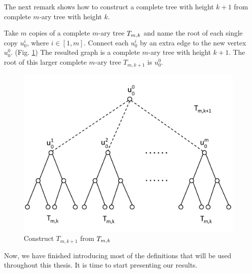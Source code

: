 The next remark shows how to construct a complete tree with height $k+1$ from complete $m$-ary tree with height $k$. 
 
\begin{remark}
\label{construct}
Take $m$ copies of a complete $m$-ary tree $T_{m,k}$ and name the root of each single copy $u_0^i$, where $i \in [1,m]$. Connect each $u_0^i$ by an extra edge to the new vertex $u_0^0$. (Fig. \ref{example of construct}) The resulted graph is a complete $m$-ary tree with height $k+1$. The root of this larger complete $m$-ary tree $T_{m,k+1}$ is $u_0^0$. 

\begin{figure}
\centering
      \vspace{-0pt}
    \includegraphics[scale=0.4]{../figures/fig2-5.pdf}
        \vspace{-0pt}
\caption{Construct $T_{m,k+1}$ from $T_{m,k}$}
\label{example of construct}
\end{figure}
\end{remark}

Now, we have finished introducing most of the definitions that will be used throughout this thesis. It is time to start presenting our results.







